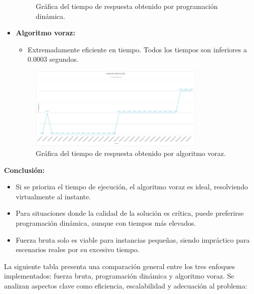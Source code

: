 \documentclass[11pt,letter]{article}
\begin{document}
\begin{itemize}
\begin{figure}[H]
            \caption{Gráfica del tiempo de respuesta obtenido por programación dinámica.}
        \end{figure}
        \item \textbf{Algoritmo voraz:}
        \begin{itemize}
            \item Extremadamente eficiente en tiempo. Todos los tiempos son inferiores a 0.0003 segundos.
        \end{itemize}
        \begin{figure}[H]
            \centering
            \includegraphics[width=0.8\textwidth]{resources/tiempo4.jpeg}
            \caption{Gráfica del tiempo de respuesta obtenido por algoritmo voraz.}
        \end{figure}
    \end{itemize}

    \textbf{Conclusión:}
    \begin{itemize}
        \item Si se prioriza el tiempo de ejecución, el algoritmo voraz es ideal, resolviendo virtualmente al instante.
        \item Para situaciones donde la calidad de la solución es crítica, puede preferirse programación dinámica, aunque con tiempos más elevados.
        \item Fuerza bruta solo es viable para instancias pequeñas, siendo impráctico para escenarios reales por su excesivo tiempo.
    \end{itemize}

    La siguiente tabla presenta una comparación general entre los tres enfoques implementados: fuerza bruta, programación dinámica y algoritmo voraz. Se analizan aspectos clave como eficiencia, escalabilidad y adecuación al problema:
\end{document}
